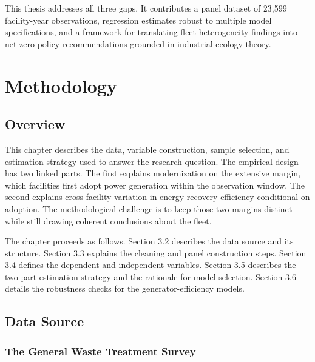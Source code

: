\documentclass[12pt,a4paper]{article}
\begin{document}
This thesis addresses all three gaps. It contributes a panel dataset of 23,599 facility-year observations, regression estimates robust to multiple model specifications, and a framework for translating fleet heterogeneity findings into net-zero policy recommendations grounded in industrial ecology theory.


\clearpage
\section{Methodology}

\subsection{Overview}

This chapter describes the data, variable construction, sample selection, and estimation strategy used to answer the research question. The empirical design has two linked parts. The first explains modernization on the extensive margin, which facilities first adopt power generation within the observation window. The second explains cross-facility variation in energy recovery efficiency conditional on adoption. The methodological challenge is to keep those two margins distinct while still drawing coherent conclusions about the fleet.

The chapter proceeds as follows. Section 3.2 describes the data source and its structure. Section 3.3 explains the cleaning and panel construction steps. Section 3.4 defines the dependent and independent variables. Section 3.5 describes the two-part estimation strategy and the rationale for model selection. Section 3.6 details the robustness checks for the generator-efficiency models.

\subsection{Data Source}

\subsubsection{The General Waste Treatment Survey}
\end{document}

